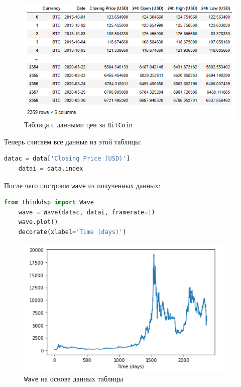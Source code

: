 \documentclass[a4paper]{article}
\begin{document}
            \begin{figure}[H]
                \centering
                \includegraphics[width=\textwidth]{ex_3_bitcoin_table.png}
                \caption{Таблица с данными цен за \texttt{BitCoin}}
                \label{fig:ex_3_bitcoin_table}
            \end{figure}
            
            Теперь считаем все данные из этой таблицы:
            
\begin{lstlisting}[language=Python, caption= Получение данных из таблицы]
    datac = data['Closing Price (USD)']
    datai = data.index
\end{lstlisting}  
            
            После чего построим \texttt{wave} из полученных данных:
            
\begin{lstlisting}[language=Python, caption= Построение \texttt{wave}]
    from thinkdsp import Wave
    wave = Wave(datac, datai, framerate=1)
    wave.plot()
    decorate(xlabel='Time (days)')
\end{lstlisting}               
            
            \begin{figure}[H]
                \centering
                \includegraphics{ex_3_bitcoin_wave.png}
                \caption{\texttt{Wave} на основе данных таблицы}
                \label{fig:ex_3_bitcoin_wave}
            \end{figure}
            
\end{document}

